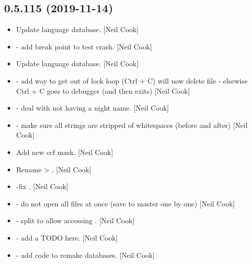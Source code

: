 \documentclass[a4paper,10pt,english]{report}
\begin{document}
\subsection{0.5.115 (2019-11-14)}
\label{\detokenize{misc/changelog:id28}}\begin{itemize}
\item {} 
Update language database. {[}Neil Cook{]}

\item {} 
 - add break point to test crash. {[}Neil
Cook{]}

\item {} 
Update language database. {[}Neil Cook{]}

\item {} 
 - add way to get out of lock loop (Ctrl + C) will now
delete file - elsewise Ctrl + C goes to debugger (and then exits)
{[}Neil Cook{]}

\item {} 
 - deal with not having a night name. {[}Neil
Cook{]}

\item {} 
 - make sure all strings are stripped of
whitespaces (before and after) {[}Neil Cook{]}

\item {} 
Add new ccf mask. {[}Neil Cook{]}

\item {} 
Rename  \textendash{}\textgreater{} . {[}Neil Cook{]}

\item {} 
 -fix . {[}Neil Cook{]}

\item {} 
 - do not open all files at once (save to master
one by one) {[}Neil Cook{]}

\item {} 
 - split  to allow accessing
. {[}Neil Cook{]}

\item {} 
 - add a TODO here. {[}Neil Cook{]}

\item {} 
 - add code to remake databases. {[}Neil Cook{]}


\end{itemize}
\end{document}
